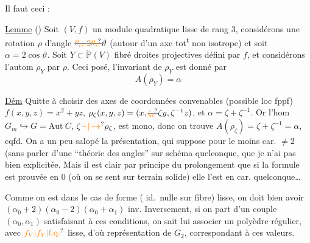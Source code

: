 Il faut  ceci :

\uline{Lemme} () Soit $(V,f)$ un module quadratique
lisse de rang $3$, considérons une rotation  $\rho$
d'angle $\deleted{\unsure{\theta_i,\,2\theta_i}}\vartheta$ (autour d'un axe tot\textsuperscript{t} non isotrope)
et soit $\alpha=2\cos\vartheta$.  Soit  $Y\subset\check{\mathbb P}(V)$ fibré
 droites projectives défini par $f$, et considérons
l'autom $\rho_Y$  par $\rho$. Ceci posé, l'invariant
de $\rho_Y$ est donné par
\[ A(\rho_Y)=\alpha \]

\uline{Dém} Quitte à choisir des axes de coordonnées convenables
(possible loc fppf)  $f(x,y,z)=x^2+yz$,
$\rho_{\zeta}(x,y,z)=(x,\deleted{\unsure{\zeta_i}}\zeta y,\zeta^{-1}z)$, et $\alpha=\zeta+\zeta^{-1}$. Or l'hom
$G_m\hookrightarrow G=\mathrm{Aut}\ C$, $\zeta\unsure{\mathbin{-}|\mapsto}\rho_{\zeta}$, est mono, donc on
trouve $A(\rho_\zeta)=\zeta+\zeta^{-1}=\alpha$, cqfd.
On a un peu salopé la présentation,  qui suppose
pour le moins  car.  $\ne2$ (sans parler d'une
``théorie des angles'' sur schéma quelconque, que je
n'ai pas bien explicitée. Mais il est clair par
principe du prolongement que si la formule  est
prouvée en  $0$ (où on se sent sur terrain
solide) elle l'est en car. quelconque\ldots

Comme on est dans le cas de forme  (
id.\ nulle sur  fibre) lisse, on doit bien avoir
$(\alpha_0+2)(\alpha_0-2)(\alpha_0+\alpha_1)$ inv. Inversement, si on part
d'un couple $(\alpha_0,\alpha_1)$ satisfaisant à ces conditions,
on sait lui associer un polyèdre régulier,
avec $\unsure{f_V|f_Y|\text{f.q.}}$ lisse, d'où représentation de $G_2$, correspondant
à ces valeurs. 

